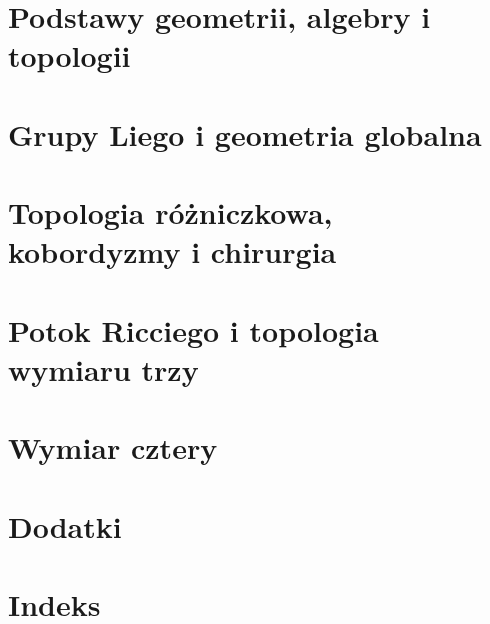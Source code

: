 \documentclass[11pt,a4paper]{report}
\begin{document}


\part{Podstawy geometrii, algebry i topologii}















\part{Grupy Liego i geometria globalna}





\part{Topologia różniczkowa, kobordyzmy i chirurgia}













\part{Potok Ricciego i topologia wymiaru trzy}




\part{Wymiar cztery}







\part{Dodatki}
\appendix




\part{Indeks}

\end{document}
